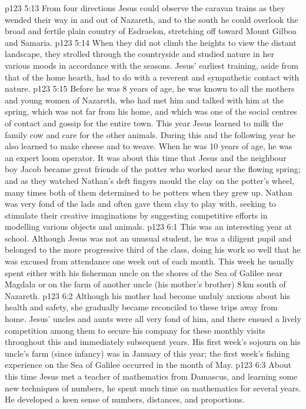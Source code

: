 \vs p123 5:13 From four directions Jesus could observe the caravan trains as they wended their way in and out of Nazareth, and to the south he could overlook the broad and fertile plain country of Esdraelon, stretching off toward Mount Gilboa and Samaria.
\vs p123 5:14 When they did not climb the heights to view the distant landscape, they strolled through the countryside and studied nature in her various moods in accordance with the seasons. Jesus’ earliest training, aside from that of the home hearth, had to do with a reverent and sympathetic contact with nature.
\vs p123 5:15 \pc Before he was 8 years of age, he was known to all the mothers and young women of Nazareth, who had met him and talked with him at the spring, which was not far from his home, and which was one of the social centres of contact and gossip for the entire town. This year Jesus learned to milk the family cow and care for the other animals. During this and the following year he also learned to make cheese and to weave. When he was 10 years of age, he was an expert loom operator. It was about this time that Jesus and the neighbour boy Jacob became great friends of the potter who worked near the flowing spring; and as they watched Nathan’s deft fingers mould the clay on the potter’s wheel, many times both of them determined to be potters when they grew up. Nathan was very fond of the lads and often gave them clay to play with, seeking to stimulate their creative imaginations by suggesting competitive efforts in modelling various objects and animals.
\vs p123 6:1 This was an interesting year at school. Although Jesus was not an unusual student, he was a diligent pupil and belonged to the more progressive third of the class, doing his work so well that he was excused from attendance one week out of each month. This week he usually spent either with his fisherman uncle on the shores of the Sea of Galilee near Magdala or on the farm of another uncle (his mother’s brother) 8\,km south of Nazareth.
\vs p123 6:2 Although his mother had become unduly anxious about his health and safety, she gradually became reconciled to these trips away from home. Jesus’ uncles and aunts were all very fond of him, and there ensued a lively competition among them to secure his company for these monthly visits throughout this and immediately subsequent years. His first week’s sojourn on his uncle’s farm (since infancy) was in January of this year; the first week’s fishing experience on the Sea of Galilee occurred in the month of May.
\vs p123 6:3 About this time Jesus met a teacher of mathematics from Damascus, and learning some new techniques of numbers, he spent much time on mathematics for several years. He developed a keen sense of numbers, distances, and proportions.

